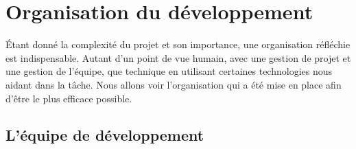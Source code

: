 \chapter{Organisation du développement}\label{chapOrganization}
\putminitoc \'Etant donné la complexité du projet et son importance, une organisation réfléchie est indispensable. Autant d'un point de vue humain, avec une gestion de projet et une gestion de l'équipe, que technique en utilisant certaines technologies nous aidant dans la tâche.  Nous allons voir l'organisation qui a été mise en place afin d'être le plus efficace possible.

\vspace{-25px}
\section{L'équipe de développement}



%

